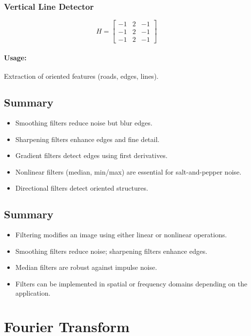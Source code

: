 \documentclass{AnantDocumentation}
\begin{document}
\subsubsection{Vertical Line Detector}
\[
H =
\begin{bmatrix}
-1 & 2 & -1\\
-1 & 2 & -1\\
-1 & 2 & -1
\end{bmatrix}
\]

\paragraph{Usage:}
Extraction of oriented features (roads, edges, lines).

\subsection{Summary}

\begin{itemize}
\item Smoothing filters reduce noise but blur edges.
\item Sharpening filters enhance edges and fine detail.
\item Gradient filters detect edges using first derivatives.
\item Nonlinear filters (median, min/max) are essential for salt-and-pepper noise.
\item Directional filters detect oriented structures.
\end{itemize}

\subsection{Summary}

\begin{itemize}
\item Filtering modifies an image using either linear or nonlinear operations.
\item Smoothing filters reduce noise; sharpening filters enhance edges.
\item Median filters are robust against impulse noise.
\item Filters can be implemented in spatial or frequency domains depending on the application.
\end{itemize}

\section{Fourier Transform}
\end{document}

